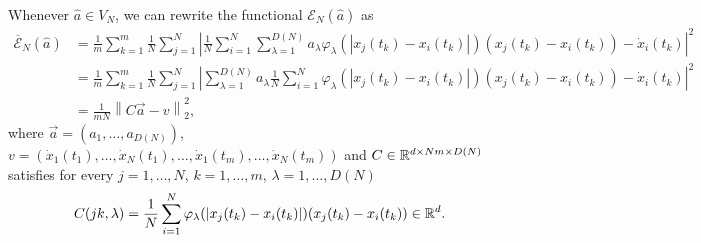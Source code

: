 Whenever $\widehat{a} \in V_N$, we can rewrite the functional $\mathcal{E}_N(\widehat{a})$ as
\begin{align*}
\overline{\mathcal{E}}_N(\widehat{a}) & = \frac{1}{m} \sum^m_{k = 1} \frac{1}{N} \sum^N_{j = 1} \left| \frac{1}{N} \sum^N_{i = 1} \sum^{D(N)}_{\lambda = 1} a_{\lambda} \varphi_{\lambda}(|x_j(t_k) - x_i(t_k)|)(x_j(t_k) - x_i(t_k)) - \dot{x}_i(t_k)\right|^2 \\
& = \frac{1}{m} \sum^m_{k = 1} \frac{1}{N} \sum^N_{j = 1} \left| \sum^{D(N)}_{\lambda = 1} a_{\lambda} \frac{1}{N} \sum^N_{i = 1} \varphi_{\lambda}(|x_j(t_k) - x_i(t_k)|)(x_j(t_k) - x_i(t_k)) - \dot{x}_i(t_k)\right|^2 \\
& = \frac{1}{mN} \left\| C \vec{a} - v \right\|^2_{2},
\end{align*}
where $\vec{a} = (a_1, \ldots, a_{D(N)})$, $v = (\dot{x}_1(t_1), \ldots, \dot{x}_N(t_1), \ldots,\dot{x}_1(t_m), \ldots, \dot{x}_N(t_m))$ and $C \in \mathbb{R}^{d\times Nm \times D(N)}$ satisfies for every $j = 1, \ldots,N$, $k = 1, \ldots,m$, $\lambda = 1, \ldots,D(N)$
\begin{align*}
C(jk,\lambda) = \frac{1}{N} \sum^N_{i = 1} \varphi_{\lambda}(|x_j(t_k) - x_i(t_k)|)(x_j(t_k) - x_i(t_k)) \in \mathbb{R}^d.
\end{align*}

